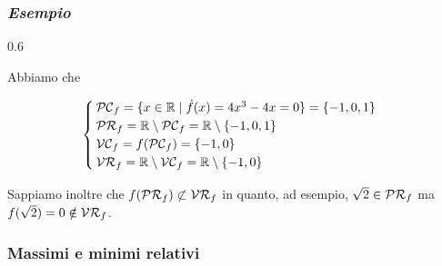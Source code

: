 \subsubsection{\textit{Esempio}}

	{0.6}{%
			}

Abbiamo che

\begin{equation}
	\begin{cases}
		\mathcal{PC}_{f} = \{ x \in \mathbb{R} \mid \dot{f}(x) = 4 x^{3} - 4 x = 0 \} = \{ -1, 0, 1 \}\\
		\mathcal{PR}_{f} = \mathbb{R} \setminus \mathcal{PC}_{f} = \mathbb{R} \setminus \{ -1, 0, 1 \}\\
		\mathcal{VC}_{f} = f(\mathcal{PC}_{f}) = \{ -1, 0 \}\\
		\mathcal{VR}_{f} = \mathbb{R} \setminus \mathcal{VC}_{f} = \mathbb{R} \setminus \{ -1, 0 \}
	\end{cases}
\end{equation}

Sappiamo inoltre che $ f(\mathcal{PR}_{f}) \not\subset \mathcal{VR}_{f} $ in quanto, ad esempio, $ \sqrt{2} \in \mathcal{PR}_{f} $ ma $ f(\sqrt{2}) = 0 \notin \mathcal{VR}_{f} $.

\subsubsection{Massimi e minimi relativi}

